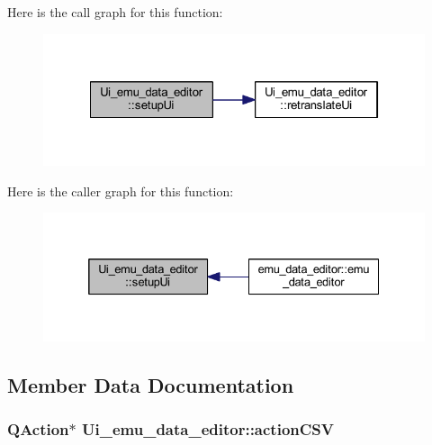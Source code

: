 Here is the call graph for this function\+:
\nopagebreak
\begin{figure}[H]
\begin{center}
\leavevmode
\includegraphics[width=322pt]{d1/d51/a00079_a33af8ac054888d9cc0833b699028b690_cgraph}
\end{center}
\end{figure}




Here is the caller graph for this function\+:
\nopagebreak
\begin{figure}[H]
\begin{center}
\leavevmode
\includegraphics[width=332pt]{d1/d51/a00079_a33af8ac054888d9cc0833b699028b690_icgraph}
\end{center}
\end{figure}




\subsection{Member Data Documentation}
\hypertarget{a00079_afae3d61aac77b6c20a7953b3adba9672}{
\subsubsection[{action\+C\+S\+V}]{\setlength{\rightskip}{0pt plus 5cm}Q\+Action$\ast$ Ui\+\_\+emu\+\_\+data\+\_\+editor\+::action\+C\+S\+V}}\label{a00079_afae3d61aac77b6c20a7953b3adba9672}


